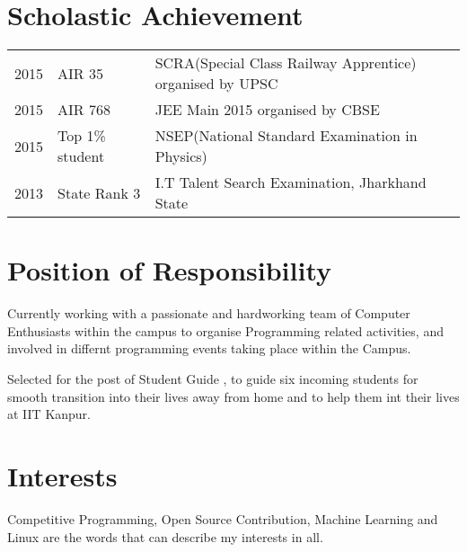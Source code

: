 \documentclass[]{deedy-resume-openfont}
\begin{document}
\begin{minipage}[t]{0.66\textwidth}
\section{Scholastic Achievement} 
\begin{tabular}{rll}
2015	     & AIR 35  & SCRA(Special Class Railway Apprentice) organised by UPSC\\
2015	     & AIR 768  & JEE Main 2015 organised by CBSE \\
2015	     & Top 1\% student  & NSEP(National Standard Examination in Physics)\\
2013	     & State Rank 3 & I.T Talent Search Examination, Jharkhand State\\
\end{tabular}
\sectionsep




\section{Position of Responsibility}
Currently working with a passionate and hardworking team of Computer Enthusiasts within the campus to organise Programming related activities, and involved in differnt programming events taking place within the Campus.
\sectionsep

Selected for the post of Student Guide , to guide six incoming students for smooth transition into their lives away from home and to help them int their lives at IIT Kanpur.
\sectionsep




\section{Interests} 
Competitive Programming, Open Source Contribution, Machine Learning and Linux are the words that can describe my interests in all.



\sectionsep

\end{minipage} 
\end{document}
